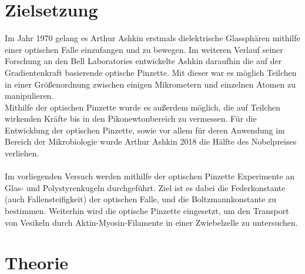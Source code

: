 \setcounter{page}{1}
\section*{Zielsetzung}
Im Jahr 1970 gelang es Arthur Ashkin erstmals dielektrische Glassphären mithilfe einer optischen Falle einzufangen und zu bewegen. \cite{Ashkin70} Im weiteren Verlauf seiner Forschung an den Bell Laboratories entwickelte Ashkin daraufhin die auf der Gradientenkraft basierende optische Pinzette.  Mit dieser war es möglich Teilchen in einer Größenordnung zwischen einigen Mikrometern und einzelnen Atomen zu manipulieren. \cite{Ahskin86}\\
Mithilfe der optischen Pinzette wurde es außerdem möglich, die auf Teilchen wirkenden Kräfte bis in den Pikonewtonbereich zu vermessen. Für die Entwicklung der optischen Pinzette, sowie vor allem für deren Anwendung im Bereich der Mikrobiologie wurde Arthur Ashkin 2018 die Hälfte des Nobelpreises verliehen. \cite{nobel}\\
\\
Im vorliegenden Versuch werden mithilfe der optischen Pinzette Experimente an Glas- und Polystyrenkugeln durchgeführt. Ziel ist es dabei die Federkonstante (auch Fallensteifigkeit) der optischen Falle, und die Boltzmannkonstante zu bestimmen. Weiterhin wird die optische Pinzette eingesetzt, um den Transport von Vesikeln durch Aktin-Myosin-Filamente in einer Zwiebelzelle zu untersuchen.\\

\section{Theorie}
